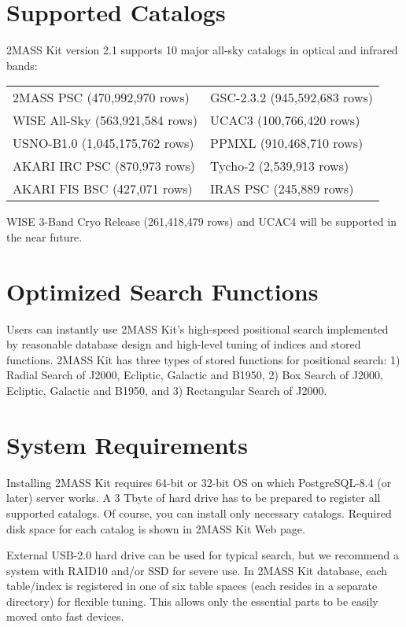 \section{Supported Catalogs}

2MASS Kit version 2.1 supports 10 major all-sky catalogs
in optical and infrared bands:
\begin{center}
\begin{tabular}{ll}
\hline
 2MASS PSC (470,992,970 rows)    &        GSC-2.3.2 (945,592,683 rows) \\
 WISE All-Sky (563,921,584 rows) &       UCAC3 (100,766,420 rows) \\
 USNO-B1.0 (1,045,175,762 rows) &       PPMXL (910,468,710 rows) \\
 AKARI IRC PSC (870,973 rows)    &       Tycho-2 (2,539,913 rows) \\
 AKARI FIS BSC (427,071 rows)    &       IRAS PSC (245,889 rows) \\
\hline
\end{tabular}
\end{center}
WISE 3-Band Cryo Release (261,418,479 rows) and UCAC4
will be supported in the near future.


\section{Optimized Search Functions}

Users can instantly use 2MASS Kit's high-speed positional search
implemented by reasonable database design and high-level tuning of 
indices and stored functions.
2MASS Kit has three types of stored functions for
positional search:
1) Radial Search of J2000, Ecliptic, Galactic and B1950,
2) Box Search of J2000, Ecliptic, Galactic and B1950, and
3) Rectangular Search of J2000.


\section{System Requirements}

Installing 2MASS Kit requires
64-bit or 32-bit OS on which PostgreSQL-8.4 (or later) server works.
A 3 Tbyte of hard drive has to be prepared to register all supported catalogs.
Of course, you can install only necessary catalogs.
Required disk space for each catalog is shown in 2MASS Kit Web page.

External USB-2.0 hard drive can be used for typical search,
but we recommend a system with RAID10 and/or SSD for severe use.
In 2MASS Kit database, each table/index is registered in one of six
table spaces (each resides in a separate directory)
for flexible tuning. 
This allows only the essential parts to be easily moved onto fast devices.


